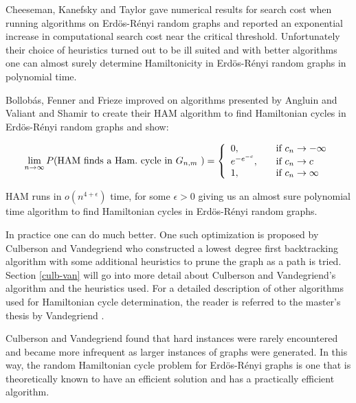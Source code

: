 \documentclass[twoside,11pt]{article}
\begin{document}
Cheeseman, Kanefsky and Taylor \citeyear{cheeseman}
gave numerical results for search cost when running algorithms
on Erd\"os-R\'enyi random graphs and reported an exponential
increase in computational search cost near the critical threshold.
Unfortunately their choice of heuristics turned out to be ill
suited and with better algorithms one can almost surely
determine Hamiltonicity
in Erd\"os-R\'enyi random graphs in polynomial time.

Bollob\'as, Fenner and Frieze \citeyear{bollobas_fenner_frieze} improved on
algorithms presented by Angluin and Valiant \citeyear{angluin} and Shamir \citeyear{shamir}
to create their
HAM algorithm to find Hamiltonian cycles
in Erd\"os-R\'enyi random graphs and show:

$$ \displaystyle\lim_{n \to \infty} P(\text{HAM finds a Ham.\ cycle in $G_{n,m}$ }) = 
\left\{ \begin{array}{l l l}
  0, & \quad \text{if $c_n \to -\infty$}\\
  e^{-e^{-c}}, & \quad \text{if $c_n \to c$}\\
  1, & \quad \text{if $c_n \to \infty$}
\end{array} \right.
$$

HAM runs in $o(n^{4+\epsilon})$ time, for some $\epsilon > 0$ giving us an almost sure
polynomial time algorithm to find Hamiltonian cycles in Erd\"os-R\'enyi random
graphs.

In practice one can do much better.
One such optimization is proposed by Culberson and Vandegriend \citeyear{vandegriend}
who constructed a lowest degree first backtracking algorithm
with some additional heuristics to prune the graph as a path is tried.
Section \ref{culb-van} will go into more detail about Culberson and Vandegriend's algorithm and the heuristics used.
For a detailed description of other algorithms used for Hamiltonian cycle determination,
the reader is referred to the master's thesis by Vandegriend \citeyear{vandegriend_thesis}.

Culberson and Vandegriend found that hard instances were rarely encountered and became more
infrequent as larger instances of graphs were generated.  In this way, the random
Hamiltonian cycle problem for Erd\"os-R\'enyi graphs is one that is theoretically
known to have an efficient solution and has a practically efficient algorithm.
\end{document}
